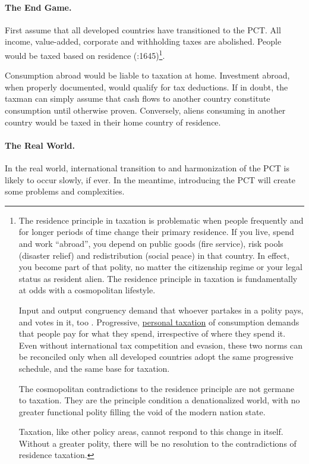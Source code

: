 \paragraph{The End Game.} First assume that all developed countries have transitioned to the PCT. All income, value-added, corporate and withholding taxes are abolished. People would be taxed based on residence (\citealt{Graetz2009}:1645)\footnote{
	The residence principle in taxation is problematic when people frequently and for longer periods of time change their primary residence. If you live, spend and work ``abroad'', you depend on public goods (fire service), risk pools (disaster relief) and redistribution (social peace) in that country. In effect, you become part of that polity, no matter the citizenship regime or your legal status as resident alien. The residence principle in taxation is fundamentally at odds with a cosmopolitan lifestyle.

	Input and output congruency demand that whoever partakes in a polity pays, and votes in it, too \citep{Zurn-2000-aa}. Progressive, \hyperref[des:PersonalTaxation]{personal taxation} of consumption demands that people pay for what they spend, irrespective of where they spend it. Even without international tax competition and evasion, these two norms can be reconciled only when all developed countries adopt the same progressive schedule, and the same base for taxation.

	The cosmopolitan contradictions to the residence principle are not germane to taxation. They are the principle condition a denationalized world, with no greater functional polity filling the void of the modern nation state.

	Taxation, like other policy areas, cannot respond to this change in itself. Without a greater polity, there will be no resolution to the contradictions of residence taxation.}.

Consumption abroad would be liable to taxation at home. Investment abroad, when properly documented, would qualify for tax deductions. If in doubt, the taxman can simply assume that cash flows to another country constitute consumption until otherwise proven. Conversely, aliens consuming in another country would be taxed in their home country of residence.

\paragraph{The Real World.} In the real world, international transition to and harmonization of the PCT is likely to occur slowly, if ever. In the meantime, introducing the PCT will create some problems and complexities.

